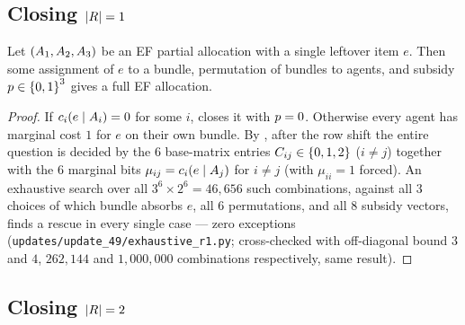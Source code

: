 \subsection{Closing \texorpdfstring{$\left\lvert R\right\rvert = 1$}{|R|=1}}

\begin{theorem}
\label{thm:g-single}
Let $(A_{1},A_{2},A_{3})$ be an EF partial allocation with a single
leftover item $e$. Then some assignment of $e$ to a bundle, permutation of
bundles to agents, and subsidy $p \in \left\{0,1\right\}^3$ gives a full EF
allocation.
\end{theorem}
\begin{proof}
If $c_i(e \mid A_{i}) = 0$ for some $i$,  closes it
with $p=0$. Otherwise every agent has marginal cost $1$ for $e$ on
their own bundle. By , after the row shift the entire
question is decided by the $6$ base-matrix entries $C_{ij} \in \left\{0,1,2\right\}$
($i\ne j$) together with the $6$ marginal bits $\mu_{ij} = c_i(e \mid
A_{j})$ for $i \ne j$ (with $\mu_{ii}=1$ forced). An exhaustive search
over all $3^6 \times 2^6 = 46{,}656$ such combinations, against all $3$
choices of which bundle absorbs $e$, all $6$ permutations, and all $8$
subsidy vectors, finds a rescue in every single case --- zero exceptions
(\texttt{updates/update\_49/exhaustive\_r1.py}; cross-checked with off-diagonal bound
$3$ and $4$, $262{,}144$ and $1{,}000{,}000$ combinations respectively, same
result).
\end{proof}

\subsection{Closing \texorpdfstring{$\left\lvert R\right\rvert = 2$}{|R|=2}}


